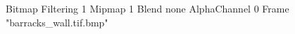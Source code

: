 {Bitmap
	{Filtering 1}
	{Mipmap 1}
	{Blend none}
	{AlphaChannel 0}
	{Frame "barracks_wall.tif.bmp"}
}
